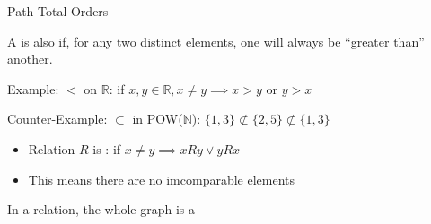 \begin{frame}{Path Total Orders}

    A  is also  if, for any two distinct elements, one will always be ``greater than'' another.

    \bigskip

    Example: $<$ on $\mathbb{R}$: if $x,y \in \mathbb{R},
    x\neq y \implies x>y \text{ or } y>x$

    \bigskip

    Counter-Example: $\subset$ in POW($\mathbb{N}$): $\{1,3\} \not\subset \{2,5\} \not\subset \{1,3\}$

    \vfill

    \begin{itemize}
    \item Relation $R$ is : if $x \neq y \implies xRy \lor yRx$
    \item This means there are \alert{no imcomparable elements}
    \end{itemize}

    In a  relation, the whole graph is a
  \begin{center}
  \end{center}
\end{frame}

